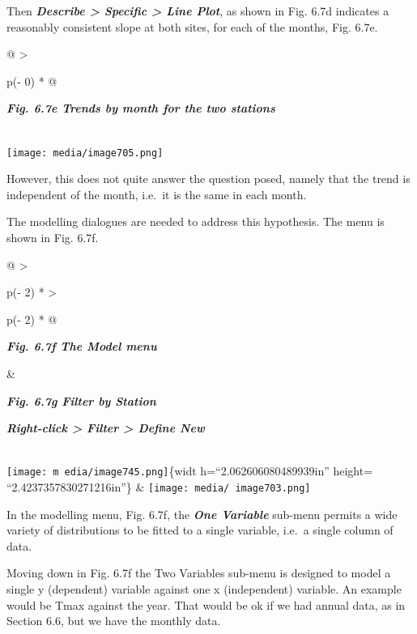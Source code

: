 \documentclass[
  letterpaper,
  DIV=11,
  numbers=noendperiod]{scrreprt}
\begin{document}
Then \textbf{\emph{Describe \textgreater{} Specific \textgreater{} Line
Plot}}, as shown in Fig. 6.7d indicates a reasonably consistent slope at
both sites, for each of the months, Fig. 6.7e.

\begin{longtable}[]{@{}
  >{\raggedright\arraybackslash}p{(\columnwidth - 0\tabcolsep) * }@{}}
\toprule\noalign{}
\begin{minipage}[b]{\linewidth}\raggedright
\textbf{\emph{Fig. 6.7e Trends by month for the two stations}}
\end{minipage} \\
\midrule\noalign{}
\endhead
\bottomrule\noalign{}
\endlastfoot
\texttt{[image: media/image705.png]} \\
\end{longtable}

However, this does not quite answer the question posed, namely that the
trend is independent of the month, i.e.~it is the same in each month.

The modelling dialogues are needed to address this hypothesis. The menu
is shown in Fig. 6.7f.

\begin{longtable}[]{@{}
  >{\raggedright\arraybackslash}p{(\columnwidth - 2\tabcolsep) * }
  >{\raggedright\arraybackslash}p{(\columnwidth - 2\tabcolsep) * }@{}}
\toprule\noalign{}
\begin{minipage}[b]{\linewidth}\raggedright
\textbf{\emph{Fig. 6.7f The Model menu}}
\end{minipage} & \begin{minipage}[b]{\linewidth}\raggedright
\textbf{\emph{Fig. 6.7g Filter by Station}}

\textbf{\emph{Right-click \textgreater{} Filter \textgreater{} Define
New}}
\end{minipage} \\
\midrule\noalign{}
\endhead
\bottomrule\noalign{}
\endlastfoot
\texttt{[image: m edia/image745.png]}\{widt h=``2.062606080489939in''
height= ``2.4237357830271216in''\} &
\texttt{[image: media/ image703.png]} \\
\end{longtable}

In the modelling menu, Fig. 6.7f, the \textbf{\emph{One Variable}}
sub-menu permits a wide variety of distributions to be fitted to a
single variable, i.e.~a single column of data.

Moving down in Fig. 6.7f the Two Variables sub-menu is designed to model
a single y (dependent) variable against one x (independent) variable. An
example would be Tmax against the year. That would be ok if we had
annual data, as in Section 6.6, but we have the monthly data.
\end{document}
